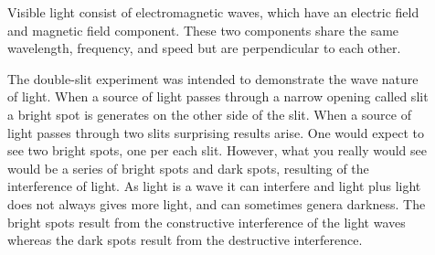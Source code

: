 \documentclass[main.tex]{subfiles}
\newcommand\chapterlabel{electrons}
\begin{document}
\begin{description}
\item[] 
Visible light consist of electromagnetic waves, which have an electric field and magnetic field component. These two components share the same wavelength, frequency, and speed but are perpendicular to each other.
      \label{Fig:{\chapterlabel}\thefigurenewcounter}\begin{center}
  \end{center} 

\item[] 
The double-slit experiment was intended to demonstrate the wave nature of light. When a source of light passes through a narrow opening called slit a bright spot is generates on the other side of the slit. When a source of light passes through two slits surprising results arise. One would expect to see two bright spots, one per each slit. However, what you really would see would be a series of bright spots and dark spots, resulting of the interference of light. As light is a wave it can interfere and light plus light does not always gives more light, and can sometimes genera darkness. The bright spots result from the constructive interference of the light waves whereas the dark spots result from the destructive interference.





\end{description}
\end{document}
